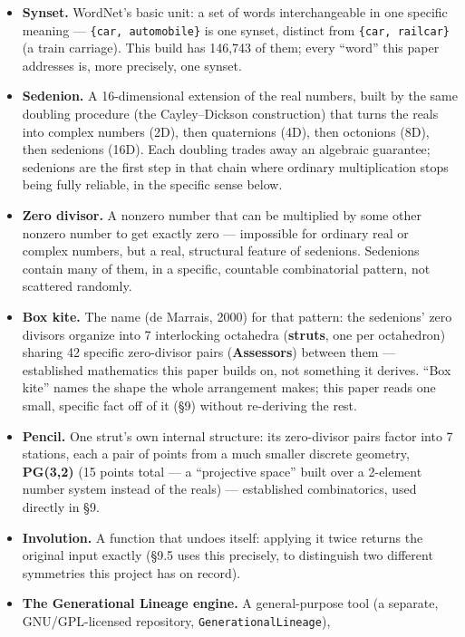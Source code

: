 \documentclass[
  10pt,
]{article}
\providecommand{\tightlist}{%
  \setlength{\itemsep}{0pt}\setlength{\parskip}{0pt}}
\begin{document}
\begin{itemize}
\tightlist
\item
  \textbf{Synset.} WordNet's basic unit: a set of words interchangeable
  in one specific meaning --- \texttt{\{car,\ automobile\}} is one
  synset, distinct from \texttt{\{car,\ railcar\}} (a train carriage).
  This build has 146,743 of them; every ``word'' this paper addresses
  is, more precisely, one synset.
\item
  \textbf{Sedenion.} A 16-dimensional extension of the real numbers,
  built by the same doubling procedure (the Cayley--Dickson
  construction) that turns the reals into complex numbers (2D), then
  quaternions (4D), then octonions (8D), then sedenions (16D). Each
  doubling trades away an algebraic guarantee; sedenions are the first
  step in that chain where ordinary multiplication stops being fully
  reliable, in the specific sense below.
\item
  \textbf{Zero divisor.} A nonzero number that can be multiplied by some
  other nonzero number to get exactly zero --- impossible for ordinary
  real or complex numbers, but a real, structural feature of sedenions.
  Sedenions contain many of them, in a specific, countable combinatorial
  pattern, not scattered randomly.
\item
  \textbf{Box kite.} The name (de Marrais, 2000) for that pattern: the
  sedenions' zero divisors organize into 7 interlocking octahedra
  (\textbf{struts}, one per octahedron) sharing 42 specific zero-divisor
  pairs (\textbf{Assessors}) between them --- established mathematics
  this paper builds on, not something it derives. ``Box kite'' names the
  shape the whole arrangement makes; this paper reads one small,
  specific fact off of it (§9) without re-deriving the rest.
\item
  \textbf{Pencil.} One strut's own internal structure: its zero-divisor
  pairs factor into 7 stations, each a pair of points from a much
  smaller discrete geometry, \textbf{PG(3,2)} (15 points total --- a
  ``projective space'' built over a 2-element number system instead of
  the reals) --- established combinatorics, used directly in §9.
\item
  \textbf{Involution.} A function that undoes itself: applying it twice
  returns the original input exactly (§9.5 uses this precisely, to
  distinguish two different symmetries this project has on record).
\item
  \textbf{The Generational Lineage engine.} A general-purpose tool (a
  separate, GNU/GPL-licensed repository, \texttt{GenerationalLineage}),

\end{itemize}
\end{document}
